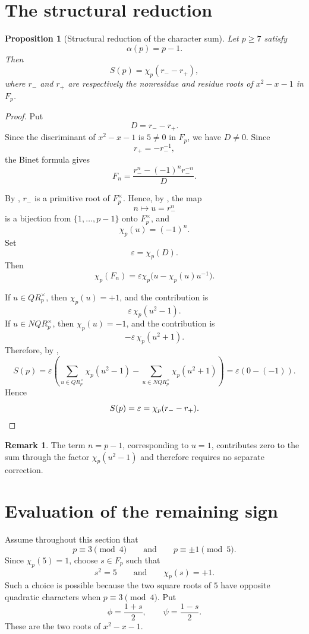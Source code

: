 \documentclass[preprint,12pt]{elsarticle}
\def\F{F}%
\def\QR{QR}%
\def\NQR{NQR}%
\numberwithin{equation}{section}
\theoremstyle{plain}
\newtheorem{proposition}[theorem]{Proposition}
\theoremstyle{definition}
\newtheorem{remark}[theorem]{Remark}
\newcommand{\F}{\mathbb{F}}
\newcommand{\QR}{\mathrm{QR}}
\newcommand{\NQR}{\mathrm{NQR}}
\begin{document}
\section{The structural reduction}\label{sec:structural-identity}
 
\begin{proposition}[Structural reduction of the character sum]
\label{prop:structural-reduction}
Let $p\ge7$ satisfy
\[
\alpha(p)=p-1.
\]
Then
\[
S(p)=\chi_p(r_--r_+),
\]
where $r_-$ and $r_+$ are respectively the nonresidue and residue
roots of $x^2-x-1$ in $\F_p$.
\end{proposition}
 
\begin{proof}
Put
\[
D=r_--r_+.
\]
Since the discriminant of $x^2-x-1$ is $5\ne0$ in $\F_p$, we have
$D\ne0$. Since
\[
r_+=-r_-^{-1},
\]
the Binet formula gives
\[
F_n
=
\frac{r_-^n-(-1)^n r_-^{-n}}{D}.
\]
 
By , $r_-$ is a primitive root of
$\F_p^\times$. Hence, by , the map
\[
n\longmapsto u=r_-^n
\]
is a bijection from $\{1,\dots,p-1\}$ onto $\F_p^\times$, and
\[
\chi_p(u)=(-1)^n.
\]
Set
\[
\varepsilon=\chi_p(D).
\]
Then
\[
\chi_p(F_n)
=
\varepsilon
\chi_p\!\bigl(u-\chi_p(u)u^{-1}\bigr).
\]
 
If $u\in\QR_p^\times$, then $\chi_p(u)=+1$, and the contribution is
\[
\varepsilon\,\chi_p(u^2-1).
\]
If $u\in\NQR_p^\times$, then $\chi_p(u)=-1$, and the contribution is
\[
-\varepsilon\,\chi_p(u^2+1).
\]
Therefore, by ,
\[
S(p)
=
\varepsilon
\left(
\sum_{u\in\QR_p^\times}\chi_p(u^2-1)
-
\sum_{u\in\NQR_p^\times}\chi_p(u^2+1)
\right)
=
\varepsilon(0-(-1)).
\]
Hence
\[
S(p)=\varepsilon=\chi_p(r_--r_+).
\qedhere
\]
\end{proof}
 
\begin{remark}
The term $n=p-1$, corresponding to $u=1$, contributes zero to the
sum through the factor $\chi_p(u^2-1)$ and therefore requires no
separate correction.
\end{remark}
 
\section{Evaluation of the remaining sign}\label{sec:sign}
 
Assume throughout this section that
\[
p\equiv3\pmod4
\qquad\text{and}\qquad
p\equiv\pm1\pmod5.
\]
Since $\chi_p(5)=1$, choose $s\in\F_p$ such that
\[
s^2=5
\qquad\text{and}\qquad
\chi_p(s)=+1.
\]
Such a choice is possible because the two square roots of $5$ have
opposite quadratic characters when $p\equiv3\pmod4$. Put
\[
\phi=\frac{1+s}{2},
\qquad
\psi=\frac{1-s}{2}.
\]
These are the two roots of $x^2-x-1$.
 
\end{document}

